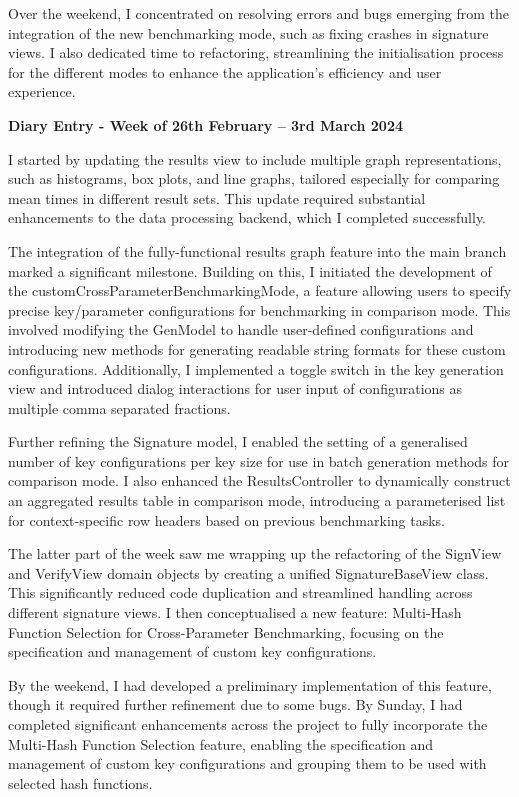 \documentclass[]{final_report}
\theoremstyle{definition}
\begin{document}
Over the weekend, I concentrated on resolving errors and bugs emerging from the integration of the
new benchmarking mode, such as fixing crashes in signature views. I also dedicated time to
refactoring, streamlining the initialisation process for the different modes to enhance the
application's efficiency and user experience.

\textbf{Diary Entry - Week of 26th February – 3rd March 2024}

I started by updating the results view to include multiple graph representations, such as
histograms, box plots, and line graphs, tailored especially for comparing mean times in different
result sets. This update required substantial enhancements to the data processing backend, which I
completed successfully.

The integration of the fully-functional results graph feature into the main branch marked a
significant milestone. Building on this, I initiated the development of the
customCrossParameterBenchmarkingMode, a feature allowing users to specify precise key/parameter
configurations for benchmarking in comparison mode. This involved modifying the GenModel to handle
user-defined configurations and introducing new methods for generating readable string formats for
these custom configurations. Additionally, I implemented a toggle switch in the key generation view
and introduced dialog interactions for user input of configurations as multiple comma separated fractions.

Further refining the Signature model, I enabled the setting of a generalised number of key
configurations per key size for use in batch generation methods for comparison mode. I also enhanced
the ResultsController to dynamically construct an aggregated results table in comparison mode,
introducing a parameterised list for context-specific row headers based on previous benchmarking
tasks.

The latter part of the week saw me wrapping up the refactoring of the SignView and VerifyView domain
objects by creating a unified SignatureBaseView class. This significantly reduced code duplication
and streamlined handling across different signature views. I then conceptualised a new feature:
Multi-Hash Function Selection for Cross-Parameter Benchmarking, focusing on the specification and
management of custom key configurations.

By the weekend, I had developed a preliminary implementation of this feature, though it required
further refinement due to some bugs. By Sunday, I had completed significant enhancements across the
project to fully incorporate the Multi-Hash Function Selection feature, enabling the specification
and management of custom key configurations and grouping them to be used with selected hash
functions.
\end{document}
